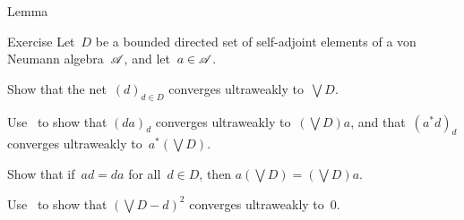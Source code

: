 \documentclass[a]{subfiles}
\begin{document}
\begin{parsec}
\begin{point}{Lemma}
\end{point}
\begin{point}{Exercise}%
Let~$D$ be a bounded directed set of self-adjoint
elements of a von Neumann algebra~$\mathscr{A}$,
and let~$a\in \mathscr{A}$.
\begin{point}%
Show that the net~$(d)_{d\in D}$ converges ultraweakly to~$\bigvee D$.
\end{point}
\begin{point}%
Use~
to show that $(da)_d$ converges ultraweakly to~$(\bigvee D)a$,
and that~$(a^*d)_d$ converges ultraweakly to~$a^* (\bigvee D)$.
\end{point}
\begin{point}%
Show that if~$ad=da$ for all~$d\in D$,
then $a(\bigvee D) = (\bigvee D)a $.
\end{point}
\begin{point}%
Use~
to show that $(\bigvee D-d)^2$ converges ultraweakly to~$0$.


\end{point}
\end{point}
\end{parsec}
\end{document}
